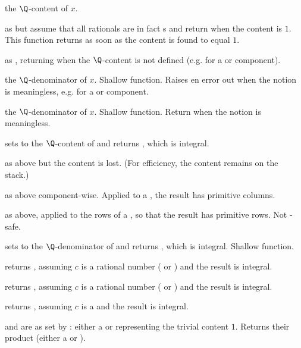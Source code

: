  the $\Q$-content of $x$.

 as  but assume that all rationals
are in fact s and return  when the content is $1$. This
function returns as soon as the content is found to equal $1$.

 as , returning
 when the $\Q$-content is not defined (e.g. for a 
or  component).

 the $\Q$-denominator of $x$. Shallow function.
Raises en  error out when the notion is meaningless, e.g. for
a  or  component.

 the $\Q$-denominator of $x$. Shallow function.
Return  when the notion is meaningless.

 sets  to the $\Q$-content
of  and returns , which is integral.

 as above but the content is lost. (For
efficiency, the content remains on the stack.)

 as above component-wise. Applied to a
, the result has primitive columns.

 as above, applied to the rows of a
, so that the result has primitive rows. Not -safe.

 sets  to the
$\Q$-denominator of  and returns , which is integral.
Shallow function.

 returns , assuming $c$
is a rational number ( or ) and the result is integral.

 returns , assuming $c$
is a rational number ( or ) and the result is integral.

 returns , assuming $c$
is a  and the result is integral.

   and  are
as set by : either a  or 
representing the trivial content $1$. Returns their product (either a
 or ).


